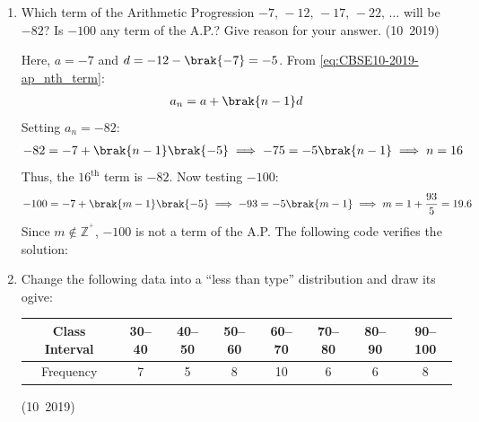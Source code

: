\begin{enumerate}[label=\thesubsection.\arabic*, ref=\thesubsection.\theenumi]
	\solution
	Let the original length of cloth be $x$ metres.
	The original rate per metre is $\frac{200}{x}$.
	With the new conditions:
	\begin{align}
		\brak{x + 5}\brak{\frac{200}{x} - 2} = 200
	\end{align}
	Expanding:
	\begin{align}
		200 - 2x + \frac{1000}{x} - 10 &= 200 \\
		-2x - 10 + \frac{1000}{x} &= 0 \\
		x^2 + 5x - 500 &= 0
	\end{align}
	Factoring:
	\begin{align}
		\brak{x + 25}\brak{x - 20} = 0 \implies x = 20\text{ m} \quad (\text{since } x > 0)
	\end{align}
	The original rate is:
	\begin{align}
		\text{Rate} = \frac{200}{20} = 10\text{ Rs./m}
	\end{align}

	
	\item Which term of the Arithmetic Progression $-7,\,-12,\,-17,\,-22,\,\ldots $ will be $-82$? Is $-100$ any term of the A.P.? Give reason for your answer.
	\hfill (10~2019)
	
	\solution
	Here, $a = -7$ and $d = -12 - \brak{-7} = -5$.
	From \eqref{eq:CBSE10-2019-ap_nth_term}:
	\begin{align}
		a_n = a + \brak{n - 1}d
	\end{align}
	Setting $a_n = -82$:
	\begin{align}
		-82 = -7 + \brak{n - 1}\brak{-5} \implies -75 = -5\brak{n - 1} \implies n = 16
	\end{align}
	Thus, the $16^{\text{th}}$ term is $-82$.
	Now testing $-100$:
	\begin{align}
		-100 = -7 + \brak{m - 1}\brak{-5} \implies -93 = -5\brak{m - 1} \implies m = 1 + \frac{93}{5} = 19.6
	\end{align}
	Since $m \notin \mathbb{Z}^^+$, $-100$ is not a term of the A.P.
	The following code verifies the solution:

	\item Change the following data into a ``less than type'' distribution and draw its ogive:
	\begin{center}
		\begin{tabular}{|c|c|c|c|c|c|c|c|}
			\hline
			Class Interval & 30--40 & 40--50 & 50--60 & 60--70 & 70--80 & 80--90 & 90--100\\
			\hline
			Frequency & 7 & 5 & 8 & 10 & 6 & 6 & 8\\
			\hline
		\end{tabular}
	\end{center}
	\hfill (10~2019)
	

\end{enumerate}
